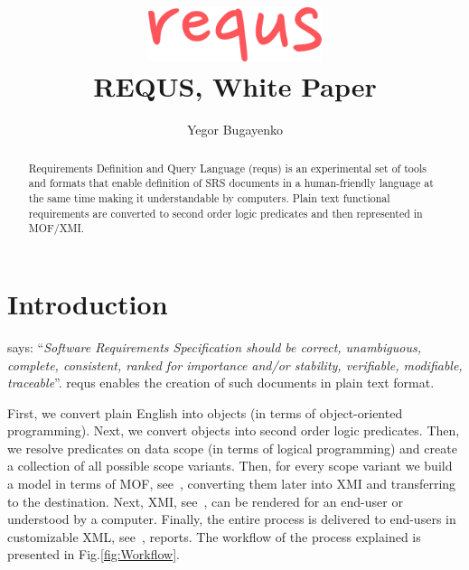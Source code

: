 \documentclass[12pt,oneside,letterpaper]{article}
\begin{document}
\raggedright
\setlength{\parindent}{0pt}
\setlength{\parskip}{1em}
\newenvironment{maths}
{\vspace*{0.5em}\begin{tabular}{l>{\raggedright\arraybackslash}p{20em}}}
{\end{tabular}\vspace*{1em}}
\title{\includegraphics[width=2in]{logo} \\ REQUS, White Paper}
\author{Yegor Bugayenko}
\maketitle
\begin{abstract}
Requirements Definition and Query Language (requs) is
an experimental set of tools and formats that enable definition of
SRS documents in a
human-friendly language at the same time making it understandable
by computers. Plain text functional requirements are converted to
second order logic predicates and then represented in MOF/XMI.
\end{abstract}




\section{Introduction}

\citet{ieee830} says: ``\emph{Software Requirements Specification should be
correct, unambiguous, complete, consistent, ranked for importance and/or stability,
verifiable, modifiable, traceable}''. requs enables the creation
of such documents in plain text format.

First, we convert plain English into objects (in terms of object-oriented
programming). Next, we convert objects into second order logic predicates.
Then, we resolve predicates on data scope (in terms of logical programming)
and create a collection of all possible scope variants. Then, for every
scope variant we build a model in terms of MOF, see~\citet{mof2}, converting them later
into XMI and transferring to the destination. Next, XMI, see~\citet{mof-to-xmi}, can be rendered
for an end-user or understood by a computer. Finally, the entire process
is delivered to end-users in customizable XML, see~\citet{xml}, reports.
The workflow of the process explained is presented in Fig.\ref{fig:Workflow}.
\end{document}
